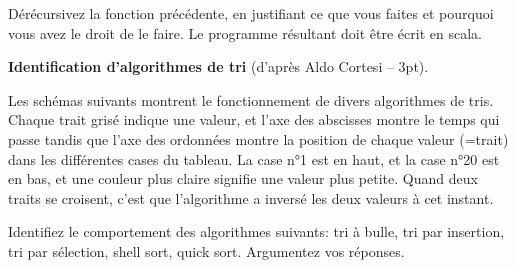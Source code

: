 \documentclass[10pt]{article}\usepackage[nu]{esial}
\begin{document}
\begin{Question} 
  Dérécursivez la fonction précédente, en justifiant ce que vous
  faites et pourquoi vous avez le droit de le faire. Le programme résultant
  doit être écrit en scala.
\end{Question}
\begin{Reponse}
\end{Reponse}

\medskip
\Exercice\textbf{Identification d'algorithmes de tri} (d'après Aldo Cortesi --
3pt).

Les schémas suivants montrent le fonctionnement de divers algorithmes de
tris. Chaque trait grisé indique une valeur, et l'axe des abscisses montre le
temps qui passe tandis que l'axe des ordonnées montre la position de chaque
valeur (=trait) dans les différentes cases du tableau. La case n°1 est en haut,
et la case n°20 est en bas, et une couleur plus claire signifie une valeur plus
petite. Quand deux traits se croisent, c'est que l'algorithme a inversé les
deux valeurs à cet instant.

\Question Identifiez le comportement des algorithmes suivants: tri à bulle, tri
par insertion, tri par sélection, shell sort, quick sort. Argumentez vos
réponses. 

\bigskip
\end{document}
